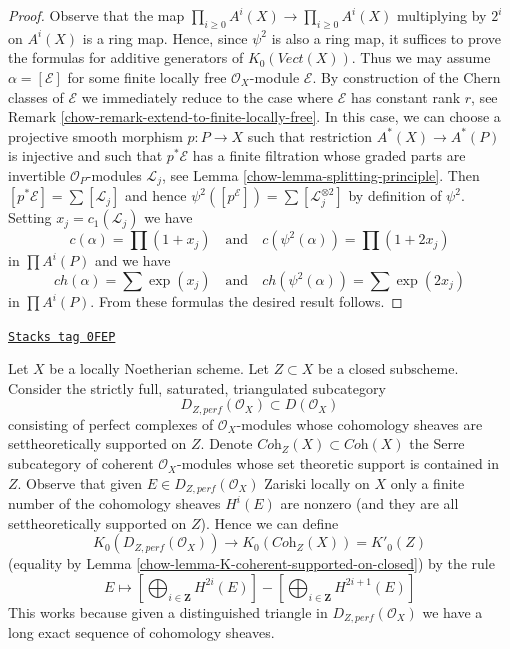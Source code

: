 \begin{proof}

Observe that the map $\prod_{i \geq 0} A^i(X) \to \prod_{i \geq 0} A^i(X)$
multiplying by $2^i$ on $A^i(X)$ is a ring map. Hence, since $\psi^2$
is also a ring map, it suffices to prove the formulas for additive generators
of $K_0(\textit{Vect}(X))$. Thus we may assume $\alpha = [\mathcal{E}]$
for some finite locally free $\mathcal{O}_X$-module $\mathcal{E}$.
By construction of the Chern classes of $\mathcal{E}$ we immediately
reduce to the case where $\mathcal{E}$ has constant rank $r$, see
Remark \ref{chow-remark-extend-to-finite-locally-free}.
In this case, we can choose a projective smooth morphism $p : P \to X$
such that restriction $A^*(X) \to A^*(P)$ is injective
and such that $p^*\mathcal{E}$ has a finite filtration whose
graded parts are invertible $\mathcal{O}_P$-modules $\mathcal{L}_j$, see
Lemma \ref{chow-lemma-splitting-principle}. Then
$[p^*\mathcal{E}] = \sum [\mathcal{L}_j]$ and hence
$\psi^2([p^\mathcal{E}]) = \sum [\mathcal{L}_j^{\otimes 2}]$
by definition of $\psi^2$. Setting $x_j  = c_1(\mathcal{L}_j)$
we have
$$
c(\alpha) = \prod (1 + x_j)
\quad\text{and}\quad
c(\psi^2(\alpha)) = \prod (1 + 2 x_j)
$$
in $\prod A^i(P)$ and we have
$$
ch(\alpha) = \sum \exp(x_j)
\quad\text{and}\quad
ch(\psi^2(\alpha)) = \sum \exp(2 x_j)
$$
in $\prod A^i(P)$. From these formulas the desired result follows.
\end{proof}

\begin{remark}
\label{chow-remark-perf-Z-cohomology-K}
\href{https://stacks.math.columbia.edu/tag/0FEP}{\texttt{Stacks tag 0FEP}}

Let $X$ be a locally Noetherian scheme.
Let $Z \subset X$ be a closed subscheme. Consider the strictly
full, saturated, triangulated subcategory
$$
D_{Z, perf}(\mathcal{O}_X) \subset D(\mathcal{O}_X)
$$
consisting of perfect complexes of $\mathcal{O}_X$-modules
whose cohomology sheaves are settheoretically supported on $Z$.
Denote $\textit{Coh}_Z(X) \subset \textit{Coh}(X)$
the Serre subcategory of coherent $\mathcal{O}_X$-modules whose set theoretic
support is contained in $Z$. Observe that given
$E \in D_{Z, perf}(\mathcal{O}_X)$ Zariski locally on $X$
only a finite number of the cohomology sheaves $H^i(E)$ are nonzero
(and they are all settheoretically supported on $Z$).
Hence we can define
$$
K_0(D_{Z, perf}(\mathcal{O}_X))
\longrightarrow
K_0(\textit{Coh}_Z(X)) = K'_0(Z)
$$
(equality by Lemma \ref{chow-lemma-K-coherent-supported-on-closed}) by the rule
$$
E \longmapsto
[\bigoplus\nolimits_{i \in \mathbf{Z}} H^{2i}(E)] -
[\bigoplus\nolimits_{i \in \mathbf{Z}} H^{2i + 1}(E)]
$$
This works because given a distinguished triangle in
$D_{Z, perf}(\mathcal{O}_X)$ we have a long exact sequence of
cohomology sheaves.
\end{remark}

